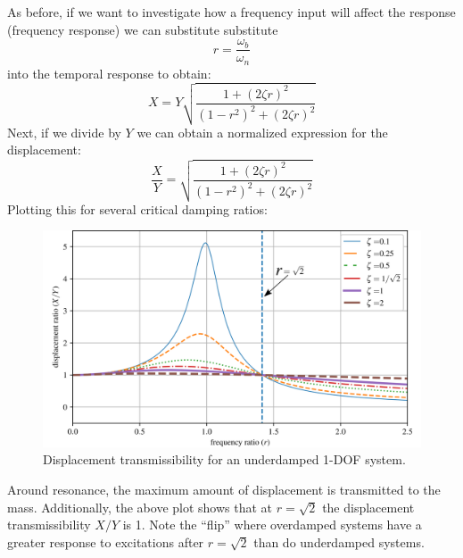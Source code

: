 \documentclass[12pt,letter]{article}
\begin{document}
		As before, if we want to investigate how a frequency input will affect the response (frequency response) we can substitute substitute 
		\begin{equation}
		r=\frac{\omega_b}{\omega_n}
		\end{equation} 
		into the temporal response to obtain:
		\begin{equation}
		X = Y \sqrt{\frac{1+(2 \zeta r)^2}{(1-r^2)^2 + (2 \zeta r )^2}} 
		\end{equation} 
		Next, if we divide by $Y$ we can obtain a normalized expression for the displacement:
		\begin{equation}
		\frac{X}{Y} = \sqrt{\frac{1+(2 \zeta r)^2}{(1-r^2)^2 + (2 \zeta r )^2}} 
		\end{equation} 
		Plotting this for several critical damping ratios:
		\begin{figure}[H]
			\centering
			\includegraphics[]{../figures/base_excitation_displacement_transmissibility}
			\caption{Displacement transmissibility for an underdamped 1-DOF system.}
		\end{figure}
		Around resonance, the maximum amount of displacement is transmitted to the mass. Additionally,  the above plot shows that at $r=\sqrt{2}$ the displacement transmissibility $X/Y$ is 1. Note the ``flip'' where overdamped systems have a greater response to excitations after $r=\sqrt{2}$ than do underdamped systems.
\end{document}
